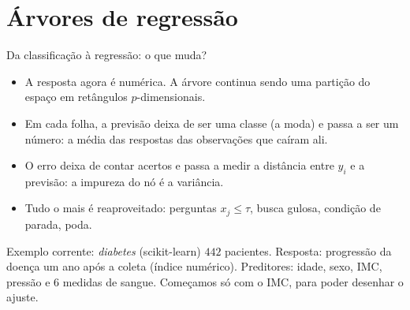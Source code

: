 \section{Árvores de regressão}\label{sec:regressao}

\begin{frame}{Da classificação à regressão: o que muda?}
\begin{itemize}
  \item A resposta agora é \alert{numérica}. A árvore continua sendo uma partição do espaço em retângulos $p$-dimensionais.
  \item Em cada folha, a previsão deixa de ser uma \alert{classe} (a moda) e passa a ser um \alert{número}: a \alert{média} das respostas das observações que caíram ali.
  \item O erro deixa de contar acertos e passa a medir a \alert{distância} entre $y_i$ e a previsão: a impureza do nó é a \alert{variância}.
  \item Tudo o mais é reaproveitado: perguntas $x_j\le\tau$, busca gulosa, condição de parada, poda.
\end{itemize}
\vspace{4pt}
\begin{block}{Exemplo corrente: \emph{diabetes} (scikit-learn)}
$442$ pacientes. Resposta: \alert{progressão da doença} um ano após a coleta (índice numérico). Preditores: idade, sexo, IMC, pressão e $6$ medidas de sangue. Começamos só com o \alert{IMC}, para poder \alert{desenhar} o ajuste.
\end{block}
\end{frame}

